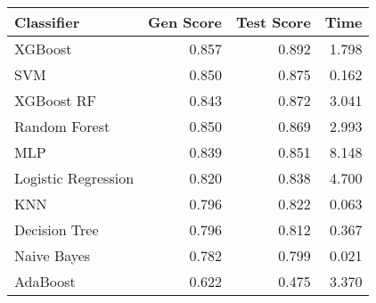 \begin{tabular}{lrrr}
\toprule
Classifier & Gen Score & Test Score & Time \\
\midrule
XGBoost & 0.857 & 0.892 & 1.798 \\
SVM & 0.850 & 0.875 & 0.162 \\
XGBoost RF & 0.843 & 0.872 & 3.041 \\
Random Forest & 0.850 & 0.869 & 2.993 \\
MLP & 0.839 & 0.851 & 8.148 \\
Logistic Regression & 0.820 & 0.838 & 4.700 \\
KNN & 0.796 & 0.822 & 0.063 \\
Decision Tree & 0.796 & 0.812 & 0.367 \\
Naive Bayes & 0.782 & 0.799 & 0.021 \\
AdaBoost & 0.622 & 0.475 & 3.370 \\
\bottomrule
\end{tabular}
